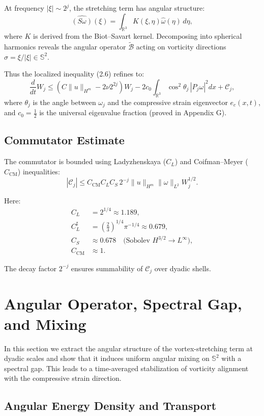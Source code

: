\documentclass[11pt]{article}
\begin{document}
At frequency $|\xi| \sim 2^j$, the stretching term has angular structure: 
\[
\widehat{(S\omega)}(\xi) = \int_{\mathbb{R}^3} K(\xi,\eta) \hat{\omega}(\eta)\, d\eta, \tag{2.8}
\]
where $K$ is derived from the Biot--Savart kernel. Decomposing into spherical harmonics reveals the angular operator $\tilde{\mathcal{B}}$ acting on vorticity directions $\sigma = \xi/|\xi| \in \mathbb{S}^2$.

Thus the localized inequality (2.6) refines to:
\[
\frac{d}{dt} W_j \leq \left( C \|u\|_{H^m} - 2\nu 2^{2j}\right) W_j 
- 2c_0 \int_{\mathbb{R}^3} \cos^2 \theta_j \, |P_j \omega|^2 dx 
+ \mathcal{C}_j, \tag{2.9}
\]
where $\theta_j$ is the angle between $\omega_j$ and the compressive strain eigenvector $e_c(x,t)$, and $c_0 = \tfrac{1}{2}$ is the universal eigenvalue fraction (proved in Appendix G).

\subsection{Commutator Estimate}

The commutator is bounded using Ladyzhenskaya ($C_L$) and Coifman--Meyer ($C_{\text{CM}}$) inequalities:
\[
|\mathcal{C}_j| \leq C_{\text{CM}} C_L C_S \, 2^{-j} \|u\|_{H^m} \|\omega\|_{L^2} W_j^{1/2}. \tag{2.10}
\]

Here:
\begin{align*}
C_L &= 2^{1/4} \approx 1.189, \\
C_L^\sharp &= \left( \tfrac{2}{3} \right)^{1/4} \pi^{-1/4} \approx 0.679, \\
C_S &\approx 0.678 \quad \text{(Sobolev $H^{3/2} \to L^\infty$)}, \\
C_{\text{CM}} &\approx 1.
\end{align*}

The decay factor $2^{-j}$ ensures summability of $\mathcal{C}_j$ over dyadic shells.

\section{Angular Operator, Spectral Gap, and Mixing}

In this section we extract the angular structure of the vortex-stretching term at dyadic scales and show that it induces uniform angular mixing on $\mathbb{S}^2$ with a spectral gap. This leads to a time-averaged stabilization of vorticity alignment with the compressive strain direction.

\subsection{Angular Energy Density and Transport}
\end{document}
